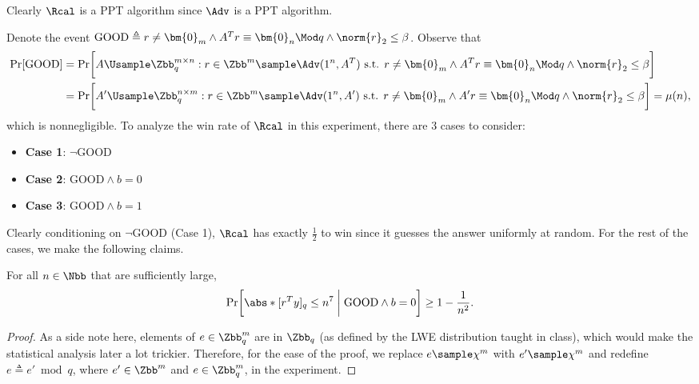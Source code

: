 \begin{answer}[iii]
    Clearly $\Rcal$ is a PPT algorithm since $\Adv$ is a PPT algorithm. 
    
    Denote the event $\textrm{GOOD}\triangleq r\neq \bm{0}_m \land  A^Tr\equiv \bm{0}_n \Mod q \land \norm{r}_2\le \beta$. Observe that
    \begin{align}\label{eq:p1-3-5}
        \Pr[\textrm{GOOD}]
        &= \Pr\biggl[A\Usample \Zbb_q^{m\times n}: r\in\Zbb^m \sample \Adv(1^n, A^T) \textrm{ s.t. } r\neq \bm{0}_m \land  A^Tr\equiv \bm{0}_n \Mod q \land \norm{r}_2\le \beta \biggr]\notag\\
        &= \Pr\biggl[A'\Usample \Zbb_q^{n\times m}: r\in\Zbb^m \sample \Adv(1^n, A') \textrm{ s.t. } r\neq \bm{0}_m \land  A'r\equiv \bm{0}_n \Mod q \land \norm{r}_2\le \beta \biggr]
        = \mu(n),
    \end{align}
    which is nonnegligible.
    To analyze the win rate of $\Rcal$ in this experiment, there are 3 cases to consider:
    \begin{itemize}
        \item \textbf{Case 1}: $\neg\textrm{GOOD}$
        \item \textbf{Case 2}: $\textrm{GOOD} \land b=0$
        \item \textbf{Case 3}: $\textrm{GOOD} \land b=1$
    \end{itemize}
    Clearly conditioning on $\neg \textrm{GOOD}$ (Case 1), $\Rcal$ has exactly $\frac{1}{2}$ to win since it guesses the answer uniformly at random. For the rest of the cases, we make the following claims.

    \begin{claim}[Case 2]\label{claim:p1-3-1}
        For all $n\in\Nbb$ that are sufficiently large,
        \[
            \Pr\biggl[\abs*{[r^Ty]_q}\le n^7 \biggm\vert \textrm{GOOD} \land b=0 \biggr]\ge 1- \frac{1}{n^2}.
        \]
    \end{claim}
    \begin{proof}
        As a side note here, elements of $e\in \Zbb_q^m$ are in $\Zbb_q$ (as defined by the LWE distribution taught in class), which would make the statistical analysis later a lot trickier. Therefore, for the ease of the proof, we replace $e\sample \chi^m$ with $e'\sample \chi^m$ and redefine $e\triangleq e'\bmod q$, where $e'\in\Zbb^m$ and $e\in\Zbb_q^m$, in the experiment.


\end{proof}
\end{answer}

